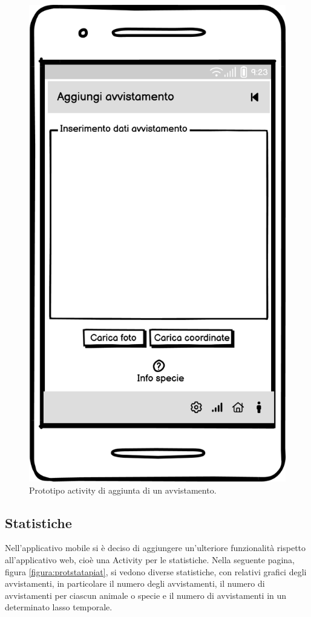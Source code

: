 \documentclass[a4paper,final,12pt]{report}
\begin{document}
\begin{figure}[hbtp]
\centering
\includegraphics[scale=0.50]{img_concettuale/Agg_avv_mob.png}
\caption{Prototipo activity di aggiunta di un avvistamento.}
\label{figura:aggavvmock}
\end{figure}

\subsection{Statistiche}
Nell'applicativo mobile si è deciso di aggiungere un'ulteriore funzionalità rispetto all'applicativo web, cioè una Activity per le statistiche. Nella seguente pagina, figura \ref{figura:protstatapiat}, si vedono diverse statistiche, con relativi grafici degli avvistamenti, in particolare il numero degli avvistamenti, il numero di avvistamenti per ciascun animale o specie e il numero di avvistamenti in un determinato lasso temporale.
\end{document}
